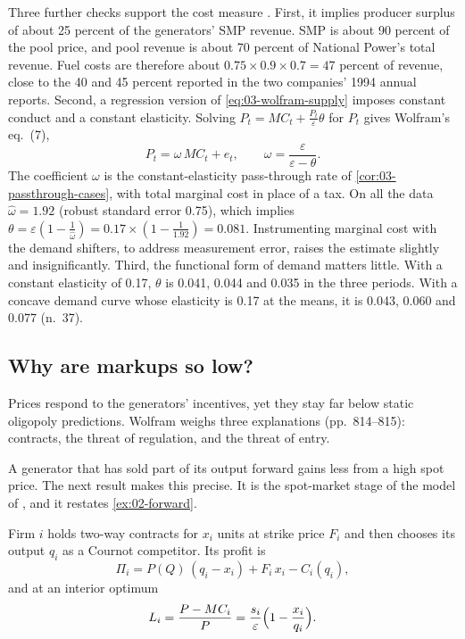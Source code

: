 Three further checks support the cost measure \citep[p.~817]{Wolfram1999}. First, it implies producer surplus of about
25 percent of the generators' SMP revenue. SMP is about 90 percent of the pool price, and pool revenue is about 70
percent of National Power's total revenue. Fuel costs are therefore about $0.75 \times 0.9 \times 0.7 = 47$ percent of
revenue, close to the 40 and 45 percent reported in the two companies' 1994 annual reports. Second, a regression version
of \eqref{eq:03-wolfram-supply} imposes constant conduct and a constant elasticity. Solving $P_t = MC_t +
\frac{P_t}{\varepsilon}\theta$ for $P_t$ gives Wolfram's eq.~(7),
\begin{equation}\label{eq:03-wolfram-omega}
P_t = \omega\, MC_t + e_t, \qquad \omega = \frac{\varepsilon}{\varepsilon - \theta}.
\end{equation}
The coefficient $\omega$ is the constant-elasticity pass-through rate of \cref{cor:03-passthrough-cases}, with total
marginal cost in place of a tax. On all the data $\hat\omega = 1.92$ (robust standard error 0.75), which implies
$\theta = \varepsilon(1 - \frac{1}{\hat\omega}) = 0.17 \times (1 - \frac{1}{1.92}) = 0.081$. Instrumenting marginal cost
with the demand shifters, to address measurement error, raises the estimate slightly and insignificantly. Third, the
functional form of demand matters little. With a constant elasticity of 0.17, $\theta$ is 0.041, 0.044 and 0.035 in the
three periods. With a concave demand curve whose elasticity is 0.17 at the means, it is 0.043, 0.060 and 0.077
(n.~37).

\subsection{Why are markups so low?}\label{sec:03-wolfram-explanations}

Prices respond to the generators' incentives, yet they stay far below static oligopoly predictions. Wolfram weighs
three explanations (pp.~814--815): contracts, the threat of regulation, and the threat of entry.

A generator that has sold part of its output forward gains less from a high spot price. The next result makes this
precise. It is the spot-market stage of the model of \citet{AllazVila1993}, and it restates \cref{ex:02-forward}.

\begin{proposition}\label{prop:03-contracts}
Firm $i$ holds two-way contracts for $x_i$ units at strike price $F_i$ and then chooses its output $q_i$ as a Cournot
competitor. Its profit is
\begin{equation*}
\Pi_i = P(Q)\,(q_i - x_i) + F_i\, x_i - C_i(q_i),
\end{equation*}
and at an interior optimum
\begin{equation}\label{eq:03-contracts}
L_i = \frac{P - MC_i}{P} = \frac{s_i}{\varepsilon}\Bigl(1 - \frac{x_i}{q_i}\Bigr).
\end{equation}
\end{proposition}

